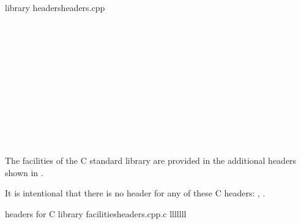 \begin{multicolfloattable}{\Cpp{} library headers}{headers.cpp}
 \\
 \\
 \\
 \\
 \\
 \\
 \\
 \\
 \\
 \\
 \\
 \\
\end{multicolfloattable}

\pnum
The facilities of the C standard library are provided in the
%
additional headers shown in .%
\begin{footnote}
It is intentional that there is no \Cpp{} header
for any of these C headers:
,
.
\end{footnote}

\begin{multicolfloattable}{\Cpp{} headers for C library facilities}{headers.cpp.c}
{lllllll}
 \\
 \\
 \\
\columnbreak
{} \\
 \\
 \\
\columnbreak
{} \\
 \\
 \\
\columnbreak
{} \\
 \\
 \\
\columnbreak
{} \\
 \\
 \\
\columnbreak
{} \\
 \\
 \\
\columnbreak
{} \\
 \\
 \\
\end{multicolfloattable}

